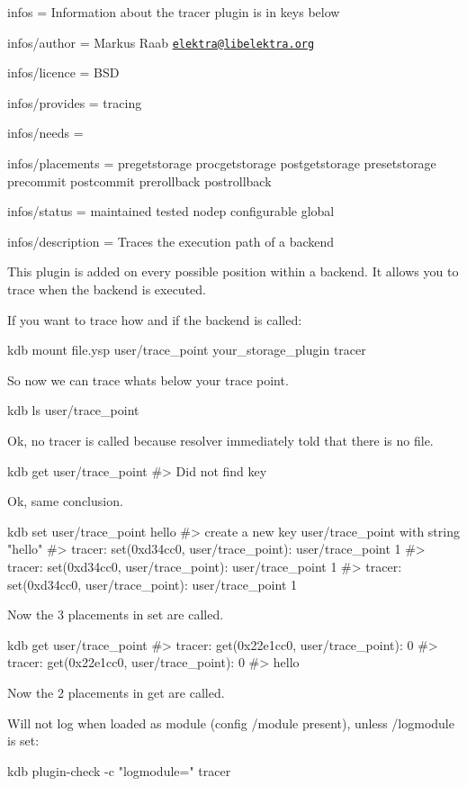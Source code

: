 
\begin{DoxyItemize}
\item infos = Information about the tracer plugin is in keys below
\item infos/author = Markus Raab \href{mailto:elektra@libelektra.org}{\tt elektra@libelektra.\+org}
\item infos/licence = B\+SD
\item infos/provides = tracing
\item infos/needs =
\item infos/placements = pregetstorage procgetstorage postgetstorage presetstorage precommit postcommit prerollback postrollback
\item infos/status = maintained tested nodep configurable global
\item infos/description = Traces the execution path of a backend
\end{DoxyItemize}

This plugin is added on every possible position within a backend. It allows you to trace when the backend is executed.

If you want to trace how and if the backend is called\+:


\begin{DoxyCode}
kdb mount file.ysp user/trace\_point your\_storage\_plugin tracer
\end{DoxyCode}


So now we can trace whats below your trace point.


\begin{DoxyCode}
kdb ls user/trace\_point
\end{DoxyCode}


Ok, no tracer is called because resolver immediately told that there is no file.


\begin{DoxyCode}
kdb get user/trace\_point
#> Did not find key
\end{DoxyCode}


Ok, same conclusion.


\begin{DoxyCode}
kdb set user/trace\_point hello
#> create a new key user/trace\_point with string "hello"
#> tracer: set(0xd34cc0, user/trace\_point): user/trace\_point 1
#> tracer: set(0xd34cc0, user/trace\_point): user/trace\_point 1
#> tracer: set(0xd34cc0, user/trace\_point): user/trace\_point 1
\end{DoxyCode}


Now the 3 placements in set are called.


\begin{DoxyCode}
kdb get user/trace\_point
#> tracer: get(0x22e1cc0, user/trace\_point): 0
#> tracer: get(0x22e1cc0, user/trace\_point): 0
#> hello
\end{DoxyCode}


Now the 2 placements in get are called.

Will not log when loaded as module (config {\ttfamily /module} present), unless {\ttfamily /logmodule} is set\+:


\begin{DoxyCode}
kdb plugin-check -c "logmodule=" tracer
\end{DoxyCode}
 